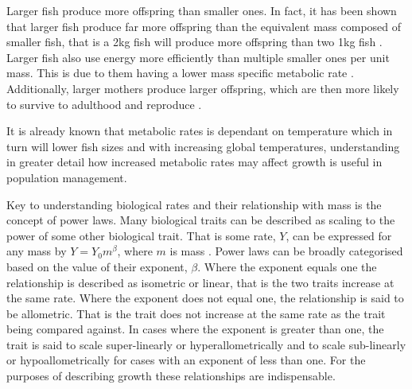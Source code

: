 \documentclass[a4paper, 11pt, hidelinks]{article} %
\begin{document}
	Larger fish produce more offspring than smaller ones.  %
	In fact, it has been shown that larger fish produce far more offspring than the equivalent mass composed of smaller fish,  that is a 2kg fish will produce more offspring than two 1kg fish \parencite{Barneche2018}.
	Larger fish also use energy more efficiently than multiple smaller ones per unit mass.  This is due to them having a lower mass specific metabolic rate \parencite{Peters1983, Kleiber1932, Brown2004}.  
	Additionally, larger mothers produce larger offspring, which are then more likely to survive to adulthood and reproduce \parencite{Hixon2014, Marshall2006}. %
	
	It is already known that metabolic rates is dependant on temperature which in turn will lower fish sizes \parencite{Gillooly2001, Brown2004} and with increasing global temperatures, understanding in greater detail how increased metabolic rates may affect growth is useful in population management.
	
	
	Key to understanding biological rates and their relationship with mass is the concept of power laws. Many biological traits can be described as scaling to the power of some other biological trait.  That is some rate, $Y$, can be expressed for any mass by $Y = Y_0 m^\beta$, where $m$ is mass \parencite{Kleiber1932}.  Power laws can be broadly categorised based on the value of their exponent, $\beta$.  
	Where the exponent equals one the relationship is described as isometric or linear, that is the two traits increase at the same rate.  
	Where the exponent does not equal one, the relationship is said to be allometric.  That is the trait does not increase at the same rate as the trait being compared against.  In cases where the exponent is greater than one, the trait is said to scale super-linearly or hyperallometrically and to scale sub-linearly or hypoallometrically for cases with an exponent of less than one.
	For the purposes of describing growth these relationships are indispensable.   
	
\end{document}
